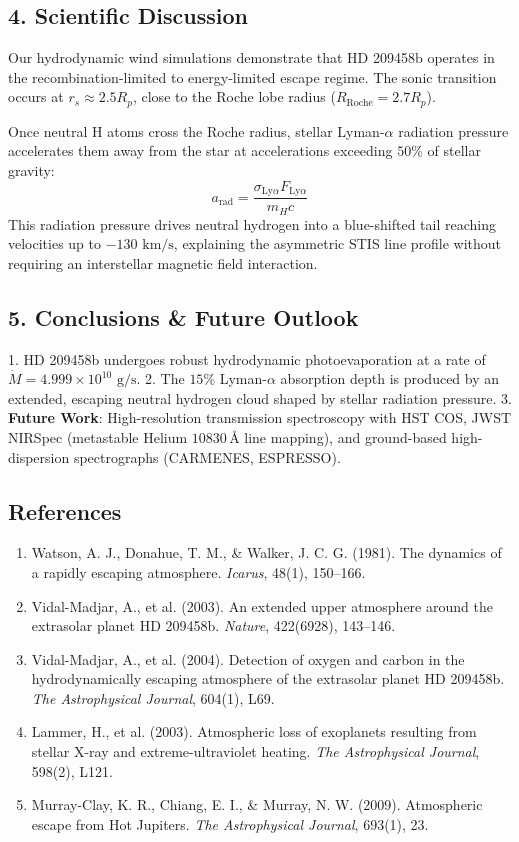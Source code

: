\documentclass[11pt,a4paper]{article}
\begin{document}
\subsection*{4. Scientific Discussion}
Our hydrodynamic wind simulations demonstrate that HD 209458b operates in the recombination-limited to energy-limited escape regime. The sonic transition occurs at $r_s \approx 2.5 R_p$, close to the Roche lobe radius ($R_{\text{Roche}} = 2.7 R_p$).

Once neutral H atoms cross the Roche radius, stellar Lyman-$\alpha$ radiation pressure accelerates them away from the star at accelerations exceeding $50\%$ of stellar gravity:
\begin{equation}
a_{\text{rad}} = \frac{\sigma_{\text{Ly}\alpha} F_{\text{Ly}\alpha}}{m_H c}
\end{equation}
This radiation pressure drives neutral hydrogen into a blue-shifted tail reaching velocities up to $-130\text{ km/s}$, explaining the asymmetric STIS line profile without requiring an interstellar magnetic field interaction.

\subsection*{5. Conclusions \& Future Outlook}
1. HD 209458b undergoes robust hydrodynamic photoevaporation at a rate of $\dot{M} = 4.999 \times 10^{10}\text{ g/s}$.
2. The $15\%$ Lyman-$\alpha$ absorption depth is produced by an extended, escaping neutral hydrogen cloud shaped by stellar radiation pressure.
3. \textbf{Future Work}: High-resolution transmission spectroscopy with HST COS, JWST NIRSpec (metastable Helium $10830\,\text{\AA}$ line mapping), and ground-based high-dispersion spectrographs (CARMENES, ESPRESSO).

\subsection*{References}
\begin{enumerate}
    \item Watson, A. J., Donahue, T. M., \& Walker, J. C. G. (1981). The dynamics of a rapidly escaping atmosphere. \textit{Icarus}, 48(1), 150--166.
    \item Vidal-Madjar, A., et al. (2003). An extended upper atmosphere around the extrasolar planet HD 209458b. \textit{Nature}, 422(6928), 143--146.
    \item Vidal-Madjar, A., et al. (2004). Detection of oxygen and carbon in the hydrodynamically escaping atmosphere of the extrasolar planet HD 209458b. \textit{The Astrophysical Journal}, 604(1), L69.
    \item Lammer, H., et al. (2003). Atmospheric loss of exoplanets resulting from stellar X-ray and extreme-ultraviolet heating. \textit{The Astrophysical Journal}, 598(2), L121.
    \item Murray-Clay, K. R., Chiang, E. I., \& Murray, N. W. (2009). Atmospheric escape from Hot Jupiters. \textit{The Astrophysical Journal}, 693(1), 23.
\end{enumerate}
\end{document}
